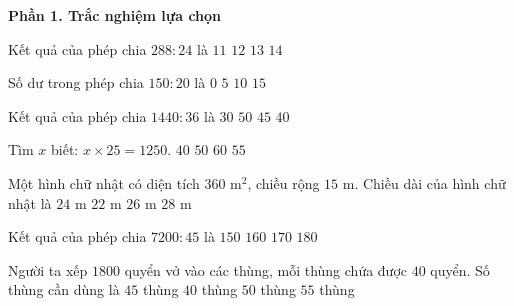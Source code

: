 \textbf{Phần 1. Trắc nghiệm lựa chọn}

\begin{ex} %
Kết quả của phép chia $288 : 24$ là
\choice
{$11$}
{\True $12$}
{$13$}
{$14$}
\end{ex}

\begin{ex} %
Số dư trong phép chia $150 : 20$ là
\choice
{$0$}
{$5$}
{\True $10$}
{$15$}
\end{ex}

\begin{ex} %
Kết quả của phép chia $1440 : 36$ là
\choice
{$30$}
{$50$}
{$45$}
{\True $40$}
\end{ex}

\begin{ex} %
Tìm $x$ biết: $x \times 25 = 1250$.
\choice
{$40$}
{\True $50$}
{$60$}
{$55$}
\end{ex}

\begin{ex} %
Một hình chữ nhật có diện tích $360\text{ m}^2$, chiều rộng $15\text{ m}$. Chiều dài của hình chữ nhật là
\choice
{\True $24\text{ m}$}
{$22\text{ m}$}
{$26\text{ m}$}
{$28\text{ m}$}
\end{ex}

\begin{ex} %
Kết quả của phép chia $7200 : 45$ là
\choice
{$150$}
{\True $160$}
{$170$}
{$180$}
\end{ex}

\begin{ex} %
Người ta xếp $1800$ quyển vở vào các thùng, mỗi thùng chứa được $40$ quyển. Số thùng cần dùng là
\choice
{\True $45$ thùng}
{$40$ thùng}
{$50$ thùng}
{$55$ thùng}
\end{ex}

